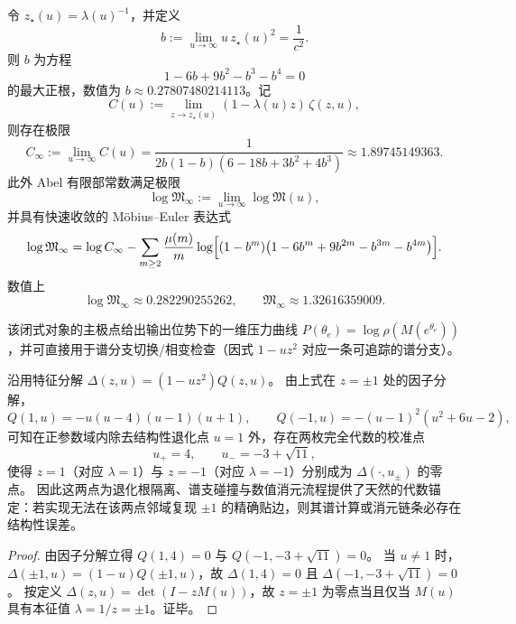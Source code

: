 \begin{proposition}[极端偏置的有限部常数极限]\label{prop:real-input-40-logM-infty}
令 $z_\star(u)=\lambda(u)^{-1}$，并定义
\[
b:=\lim_{u\to\infty}u\,z_\star(u)^2=\frac{1}{c^2}.
\]
则 $b$ 为方程
\[
1-6b+9b^2-b^3-b^4=0
\]
的最大正根，数值为 $b\approx 0.27807480214113$。记
\[
C(u):=\lim_{z\to z_\star(u)}(1-\lambda(u)z)\,\zeta(z,u),
\]
则存在极限
\[
C_\infty:=\lim_{u\to\infty}C(u)=\frac{1}{2b(1-b)(6-18b+3b^2+4b^3)}\approx 1.89745149363.
\]
此外 Abel 有限部常数满足极限
\[
\log\mathfrak{M}_\infty:=\lim_{u\to\infty}\log\mathfrak{M}(u),
\]
并具有快速收敛的 Möbius--Euler 表达式
\[
\log\mathfrak{M}_\infty
=\log C_\infty
-\sum_{m\ge 2}\frac{\mu(m)}{m}\log\Bigl[(1-b^m)\bigl(1-6b^m+9b^{2m}-b^{3m}-b^{4m}\bigr)\Bigr].
\]
数值上
\[
\log\mathfrak{M}_\infty\approx 0.282290255262,\qquad
\mathfrak{M}_\infty\approx 1.32616359009.
\]
\end{proposition}
该闭式对象的主极点给出输出位势下的一维压力曲线 $P(\theta_e)=\log\rho(M(e^{\theta_e}))$，并可直接用于谱分支切换/相变检查（因式 $1-uz^2$ 对应一条可追踪的谱分支）。


\begin{corollary}[同步核参数族的整数级共振点提供代数校准：正参数域内存在精确 \texorpdfstring{$\lambda=\pm1$}{lambda=±1} 的孤立点（230）]\label{cor:real-input-40-integer-resonance-calibration}
沿用特征分解 \(\Delta(z,u)=(1-uz^2)Q(z,u)\)。
由上式在 \(z=\pm1\) 处的因子分解，
\[
Q(1,u)=-u(u-4)(u-1)(u+1),\qquad Q(-1,u)=-(u-1)^2(u^2+6u-2),
\]
可知在正参数域内除去结构性退化点 \(u=1\) 外，存在两枚完全代数的校准点
\[
u_+=4,\qquad u_-=-3+\sqrt{11},
\]
使得 \(z=1\)（对应 \(\lambda=1\)）与 \(z=-1\)（对应 \(\lambda=-1\)）分别成为 \(\Delta(\cdot,u_\pm)\) 的零点。
因此这两点为退化根隔离、谱支碰撞与数值消元流程提供了天然的代数锚定：若实现无法在该两点邻域复现 \(\pm1\) 的精确贴边，则其谱计算或消元链条必存在结构性误差。
\end{corollary}
\begin{proof}
由因子分解立得 \(Q(1,4)=0\) 与 \(Q(-1,-3+\sqrt{11})=0\)。
当 \(u\neq 1\) 时，\(\Delta(\pm 1,u)=(1-u)Q(\pm 1,u)\)，故 \(\Delta(1,4)=0\) 且 \(\Delta(-1,-3+\sqrt{11})=0\)。
按定义 \(\Delta(z,u)=\det(I-zM(u))\)，故 \(z=\pm1\) 为零点当且仅当 \(M(u)\) 具有本征值 \(\lambda=1/z=\pm1\)。证毕。
\end{proof}


